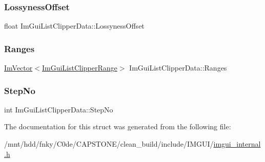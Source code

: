 \subsubsection{\texorpdfstring{Lossyness\+Offset}{LossynessOffset}}
{\footnotesize\ttfamily float Im\+Gui\+List\+Clipper\+Data\+::\+Lossyness\+Offset}

\mbox{\label{structImGuiListClipperData_ab0960f6b46ef337c649db08bb73b3fd2}} 
\subsubsection{\texorpdfstring{Ranges}{Ranges}}
{\footnotesize\ttfamily \hyperlink{structImVector}{Im\+Vector}$<$\hyperlink{structImGuiListClipperRange}{Im\+Gui\+List\+Clipper\+Range}$>$ Im\+Gui\+List\+Clipper\+Data\+::\+Ranges}

\mbox{\label{structImGuiListClipperData_a6751b323ebd8a24488d8745a3551079f}} 
\subsubsection{\texorpdfstring{Step\+No}{StepNo}}
{\footnotesize\ttfamily int Im\+Gui\+List\+Clipper\+Data\+::\+Step\+No}



The documentation for this struct was generated from the following file\+:\begin{DoxyCompactItemize}
\item 
/mnt/hdd/fnky/\+C0de/\+C\+A\+P\+S\+T\+O\+N\+E/clean\+\_\+build/include/\+I\+M\+G\+U\+I/\hyperlink{imgui__internal_8h}{imgui\+\_\+internal.\+h}\end{DoxyCompactItemize}
